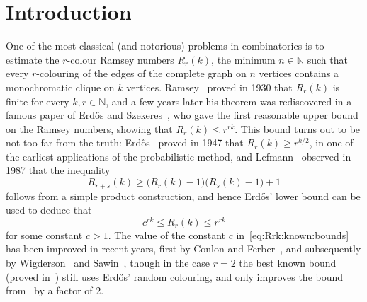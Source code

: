 \documentclass[12pt,reqno]{amsart}
\theoremstyle{definition}
\theoremstyle{remark}
\newcommand\N{\mathbb{N}}
\renewcommand{\le}{\leqslant}
\renewcommand{\ge}{\geqslant}
\def\N{\mathbb{N}}
\begin{document}
\maketitle

\section{Introduction}

One of the most classical (and notorious) problems in combinatorics is to estimate the $r$-colour Ramsey numbers $R_r(k)$, the minimum $n \in \N$ such that every $r$-colouring of the edges of the complete graph on $n$ vertices contains a monochromatic clique on $k$ vertices. Ramsey~\cite{R30} proved in 1930 that $R_r(k)$ is finite for every $k,r \in \N$, and a few years later his theorem was rediscovered in a famous paper of Erd\H{o}s and Szekeres~\cite{ESz35}, who gave the first reasonable upper bound on the Ramsey numbers, showing that $R_r(k) \le r^{rk}$. %
This bound turns out to be not too far from the truth: Erd\H{o}s~\cite{E47} proved in 1947 that $R_r(k) \ge r^{k/2}$, in one of the earliest applications of the probabilistic method, and Lefmann~\cite{L87} observed in 1987 that the inequality 
$$R_{r+s}(k) \ge \big( R_r(k) - 1 \big) \big( R_s(k) - 1 \big) + 1$$
follows from a simple product construction, and hence Erd\H{o}s' lower bound can be used to deduce that
\begin{equation}\label{eq:Rrk:known:bounds}
c^{rk} \le R_r(k) \le r^{rk}
\end{equation}
for some constant $c > 1$. The value of the constant $c$ in~\eqref{eq:Rrk:known:bounds} has been improved in recent years, first by Conlon and Ferber~\cite{CF}, and subsequently by Wigderson~\cite{W} and Sawin~\cite{S}, though in the case $r = 2$ the best known bound (proved in~\cite{S77}) still uses Erd\H{o}s' random colouring, and only improves the bound from~\cite{E47} by a factor of $2$. 
\end{document}
